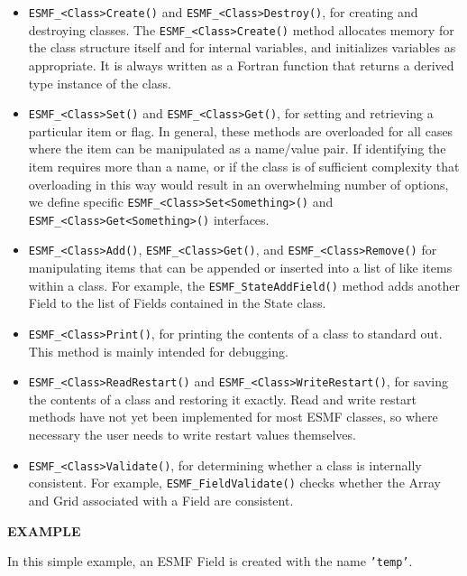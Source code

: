 \begin{itemize}

\item {\tt ESMF\_<Class>Create()} and {\tt ESMF\_<Class>Destroy()}, for creating and 
destroying classes.  The {\tt ESMF\_<Class>Create()} method allocates 
memory for the class structure itself and for internal variables, and
initializes variables as appropriate.  It is always written as a 
Fortran function that returns a derived type instance of the class.

\item {\tt ESMF\_<Class>Set()} and {\tt ESMF\_<Class>Get()}, for setting 
and retrieving a particular item or flag.  In general, these methods are
overloaded for all cases where the item can be manipulated as a
name/value pair.  If identifying the item requires more than a 
name, or if the class is of sufficient complexity that overloading
in this way would result in an overwhelming number of options, we 
define specific {\tt ESMF\_<Class>Set<Something>()} and 
{\tt ESMF\_<Class>Get<Something>()} interfaces.

\item {\tt ESMF\_<Class>Add()}, {\tt ESMF\_<Class>Get()}, and 
{\tt ESMF\_<Class>Remove()} for manipulating 
items that can be appended or inserted into a list of like
items within a class.  For example, the {\tt ESMF\_StateAddField()}
method adds another Field to the list of Fields contained
in the State class.

\item {\tt ESMF\_<Class>Print()}, for printing the contents of a class to 
standard out.  This method is mainly intended for debugging.

\item {\tt ESMF\_<Class>ReadRestart()} and {\tt ESMF\_<Class>WriteRestart()}, 
for saving the contents of a class and restoring it exactly.  Read
and write restart methods have not yet been implemented for most
ESMF classes, so where necessary the user needs to write restart 
values themselves.

\item {\tt ESMF\_<Class>Validate()}, for determining whether a class is 
internally consistent.  For example, {\tt ESMF\_FieldValidate()} checks 
whether the Array and Grid associated with a Field are consistent.

\end{itemize}

{\bf EXAMPLE}

In this simple example, an ESMF Field is created with the 
name {\tt 'temp'}.  

